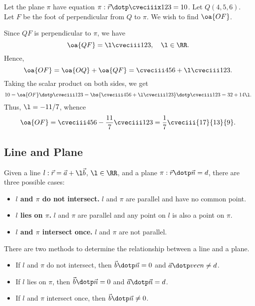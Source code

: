 \begin{example}
    Let the plane $\pi$ have equation $\pi : \vec r \dotp \cveciiix123 = 10$. Let $Q(4, 5, 6)$. Let $F$ be the foot of perpendicular from $Q$ to $\pi$. We wish to find $\oa{OF}$.

    Since $QF$ is perpendicular to $\pi$, we have \[\oa{QF} = \l \cveciii123, \quad \l \in \RR.\] Hence, \[\oa{OF} = \oa{OQ} + \oa{QF} = \cveciii456 + \l\cveciii123.\] Taking the scalar product on both sides, we get \[10 = \oa{OF} \dotp \cveciii123 = \bs{\cveciii456 + \l\cveciii123} \dotp \cveciii123 = 32 + 14\l.\] Thus, $\l = -11/7$, whence \[\oa{OF} = \cveciii456 - \frac{11}{7}\cveciii123 = \frac17 \cveciii{17}{13}{9}.\]
\end{example}

\subsection{Line and Plane}

\begin{fact}
    Given a line $l : \vec r = \vec a + \l \vec b$, $\l \in \RR$, and a plane $\pi : \vec r \dotp \vec n = d$, there are three possible cases:
    \begin{itemize}
        \item \textbf{$l$ and $\pi$ do not intersect.} $l$ and $\pi$ are parallel and have no common point.
        \item \textbf{$l$ lies on $\pi$.} $l$ and $\pi$ are parallel and any point on $l$ is also a point on $\pi$.
        \item \textbf{$l$ and $\pi$ intersect once.} $l$ and $\pi$ are not parallel.
    \end{itemize}
\end{fact}

There are two methods to determine the relationship between a line and a plane.

\begin{recipe}
    \phantom{.}
    \begin{itemize}
        \item If $l$ and $\pi$ do not intersect, then $\vec b \dotp \vec n = 0$ and $\vec a \dotp vec n \neq d$.
        \item If $l$ lies on $\pi$, then $\vec b \dotp \vec n = 0$ and $\vec a \dotp \vec n =  d$.
        \item If $l$ and $\pi$ intersect once, then $\vec b \dotp \vec n \neq 0$.
    \end{itemize}
\end{recipe}

